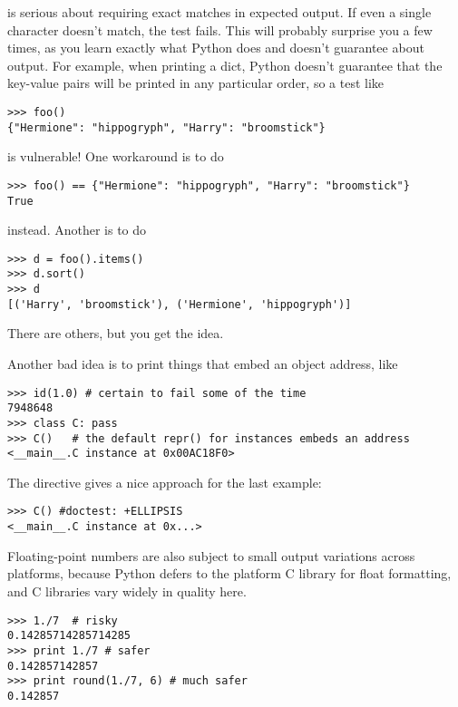  is serious about requiring exact matches in expected
output.  If even a single character doesn't match, the test fails.  This
will probably surprise you a few times, as you learn exactly what Python
does and doesn't guarantee about output.  For example, when printing a
dict, Python doesn't guarantee that the key-value pairs will be printed
in any particular order, so a test like

\begin{verbatim}
>>> foo()
{"Hermione": "hippogryph", "Harry": "broomstick"}
\end{verbatim}

is vulnerable!  One workaround is to do

\begin{verbatim}
>>> foo() == {"Hermione": "hippogryph", "Harry": "broomstick"}
True
\end{verbatim}

instead.  Another is to do

\begin{verbatim}
>>> d = foo().items()
>>> d.sort()
>>> d
[('Harry', 'broomstick'), ('Hermione', 'hippogryph')]
\end{verbatim}

There are others, but you get the idea.

Another bad idea is to print things that embed an object address, like

\begin{verbatim}
>>> id(1.0) # certain to fail some of the time
7948648
>>> class C: pass
>>> C()   # the default repr() for instances embeds an address
<__main__.C instance at 0x00AC18F0>
\end{verbatim}

The  directive gives a nice approach for the last
example:

\begin{verbatim}
>>> C() #doctest: +ELLIPSIS
<__main__.C instance at 0x...>
\end{verbatim}

Floating-point numbers are also subject to small output variations across
platforms, because Python defers to the platform C library for float
formatting, and C libraries vary widely in quality here.

\begin{verbatim}
>>> 1./7  # risky
0.14285714285714285
>>> print 1./7 # safer
0.142857142857
>>> print round(1./7, 6) # much safer
0.142857
\end{verbatim}

